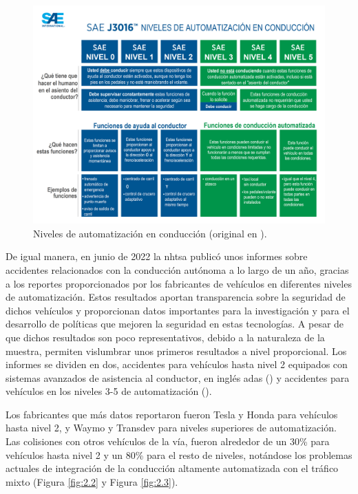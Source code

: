 \newpage
\begin{figure}[htb]
  \centering
  \includegraphics[width=13.5cm]{figures/2.1.png}
  \caption{\label{fig:2.1} Niveles de automatización en conducción (original en \textcite{sae}).}
\end{figure}

De igual manera, en junio de 2022 la \gls{nhtsa} publicó unos informes sobre accidentes relacionados con la conducción autónoma a lo largo de un año, gracias a los reportes proporcionados por los fabricantes de vehículos en diferentes niveles de automatización. Estos resultados aportan transparencia sobre la seguridad de dichos vehículos y proporcionan datos importantes para la investigación y para el desarrollo de políticas que mejoren la seguridad en estas tecnologías. A pesar de que dichos resultados son poco representativos, debido a la naturaleza de la muestra, permiten vislumbrar unos primeros resultados a nivel proporcional. Los informes se dividen en dos, accidentes para vehículos hasta nivel 2 equipados con sistemas avanzados de asistencia al conductor, en inglés \gls{adas} (\cite{nhtsa22a}) y accidentes para vehículos en los niveles 3-5 de automatización (\cite{nhtsa22b}). 

Los fabricantes que más datos reportaron fueron Tesla y Honda para vehículos hasta nivel 2, y Waymo y Transdev para niveles superiores de automatización. Las colisiones con otros vehículos de la vía, fueron alrededor de un 30\% para vehículos hasta nivel 2 y un 80\% para el resto de niveles, notándose los problemas actuales de integración de la conducción altamente automatizada con el tráfico mixto (Figura \ref{fig:2.2} y Figura \ref{fig:2.3}). 

